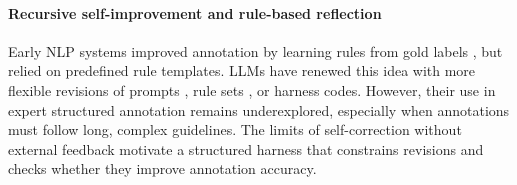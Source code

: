 \paragraph{Recursive self-improvement and rule-based reflection}
Early NLP systems improved annotation by learning rules from gold labels \citep{brill1992simple,brill1995transformation,ramshaw1995chunking}, but relied on predefined rule templates. LLMs have renewed this idea with more flexible revisions of prompts \citep{pryzant2023protegi,khattab2024dspy}, rule sets \citep{zhang2025ace,zhao2024expel}, or harness codes\citep{zelikman2024stop,hu2025adas,zhang2026dgm}. However, their use in expert structured annotation remains underexplored, especially when annotations must follow long, complex guidelines. The limits of self-correction without external feedback \citep{huang2024cannot} motivate a structured harness that constrains revisions and checks whether they improve annotation accuracy.

